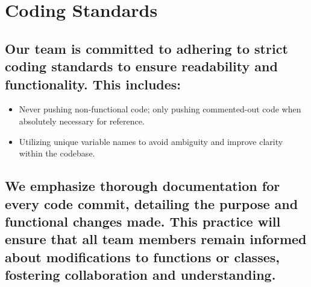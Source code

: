 \documentclass{article}
\begin{document}
\section{Coding Standards}
\subsection{Our team is committed to adhering to strict coding standards to ensure readability and functionality. This includes:
}
\begin{itemize}
    \item Never pushing non-functional code; only pushing commented-out code when absolutely necessary for reference.
    \item Utilizing unique variable names to avoid ambiguity and improve clarity within the codebase.
\end{itemize}

\subsection{We emphasize thorough documentation for every code commit, detailing the purpose and functional changes made. This practice will ensure that all team members remain informed about modifications to functions or classes, fostering collaboration and understanding.}
\end{document}

